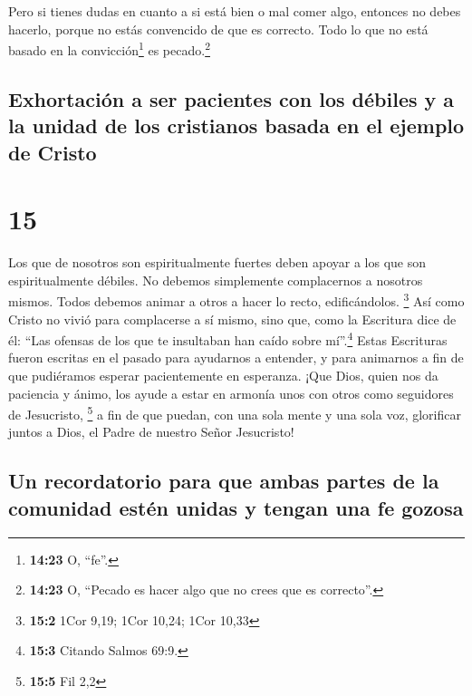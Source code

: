  Pero si tienes dudas en cuanto a si está bien o mal
comer algo, entonces no debes hacerlo, porque no estás convencido de que
es correcto. Todo lo que no está basado en la convicción\footnote{\textbf{14:23}
  O, ``fe''.} es pecado.\footnote{\textbf{14:23} O, ``Pecado es hacer
  algo que no crees que es correcto''.}

\hypertarget{exhortaciuxf3n-a-ser-pacientes-con-los-duxe9biles-y-a-la-unidad-de-los-cristianos-basada-en-el-ejemplo-de-cristo}{%
\subsection{Exhortación a ser pacientes con los débiles y a la unidad de
los cristianos basada en el ejemplo de
Cristo}\label{exhortaciuxf3n-a-ser-pacientes-con-los-duxe9biles-y-a-la-unidad-de-los-cristianos-basada-en-el-ejemplo-de-cristo}}

\hypertarget{section-14}{%
\section{15}\label{section-14}}

 Los que de nosotros son espiritualmente fuertes deben
apoyar a los que son espiritualmente débiles. No debemos simplemente
complacernos a nosotros mismos.  Todos debemos animar a
otros a hacer lo recto, edificándolos. \footnote{\textbf{15:2} 1Cor
  9,19; 1Cor 10,24; 1Cor 10,33}  Así como Cristo no vivió
para complacerse a sí mismo, sino que, como la Escritura dice de él:
``Las ofensas de los que te insultaban han caído sobre mí''.\footnote{\textbf{15:3}
  Citando Salmos 69:9.}  Estas Escrituras fueron escritas
en el pasado para ayudarnos a entender, y para animarnos a fin de que
pudiéramos esperar pacientemente en esperanza.  ¡Que Dios,
quien nos da paciencia y ánimo, los ayude a estar en armonía unos con
otros como seguidores de Jesucristo, \footnote{\textbf{15:5} Fil 2,2}
 a fin de que puedan, con una sola mente y una sola voz,
glorificar juntos a Dios, el Padre de nuestro Señor Jesucristo!

\hypertarget{un-recordatorio-para-que-ambas-partes-de-la-comunidad-estuxe9n-unidas-y-tengan-una-fe-gozosa}{%
\subsection{Un recordatorio para que ambas partes de la comunidad estén
unidas y tengan una fe
gozosa}\label{un-recordatorio-para-que-ambas-partes-de-la-comunidad-estuxe9n-unidas-y-tengan-una-fe-gozosa}}


